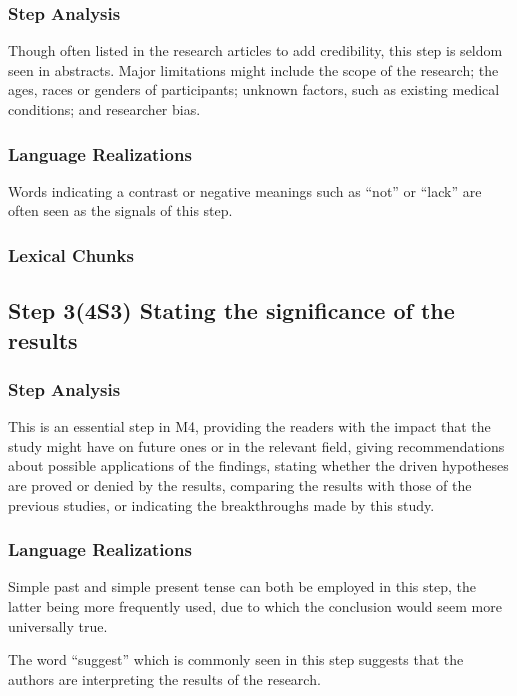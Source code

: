 \documentclass{ctexbook}
\begin{document}
    \subsubsection{Step Analysis}

    Though often listed in the research articles to add credibility, this step is seldom seen in abstracts. Major limitations might include the scope of the research; the ages, races or genders of participants; unknown factors, such as existing medical conditions; and researcher bias.

    \subsubsection{Language Realizations}

    Words indicating a contrast or negative meanings such as ``not'' or ``lack'' are often seen as the signals of this step.

    \subsubsection{Lexical Chunks}

  \subsection{Step 3(4S3) Stating the significance of the results}
    \subsubsection{Step Analysis}

    This is an essential step in M4, providing the readers with the impact that the study might have on future ones or in the relevant field, giving recommendations about possible applications of the findings, stating whether the driven hypotheses are proved or denied by the results, comparing the results with those of the previous studies, or indicating the breakthroughs made by this study.

    \subsubsection{Language Realizations}

    Simple past and simple present tense can both be employed in this step, the latter being more frequently used, due to which the conclusion would seem more universally true.
    
    The word ``suggest'' which is commonly seen in this step suggests that the authors are interpreting the results of the research.
    
\end{document}

